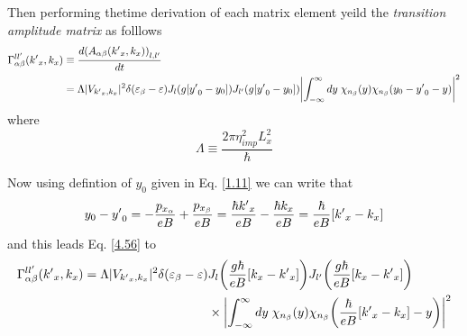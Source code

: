 Then performing thetime derivation of each matrix element yeild the \textit{transition amplitude matrix} as folllows
\begin{equation} \label{4.55}
  \begin{aligned}
    \Gamma_{\alpha\beta}^{ll'}({k'}_x,k_x) &  \equiv
    \frac{d \qty(A_{\alpha\beta}({k'}_x,k_x))_{l,l'}}{dt} \\
    & =
    \Lambda |V_{{k'}_x,k_x}|^2
    \delta(\varepsilon_{\beta} - \varepsilon)
    J_l\qty(g[{y'}_0 - y_0]) J_{l'}\qty(g[{y'}_0 - y_0])
    \qty|
    \int_{-\infty}^{\infty} dy \;
    {\chi}_{n_{\beta}}\qty(y)
    {\chi}_{n_{\beta}}\qty(y_0 - {y'}_0 - y)|^2
  \end{aligned}
\end{equation}
where
\begin{equation} \label{4.56}
    \Lambda \equiv
    \frac { 2\pi \eta_{imp}^2 L_x^2}{ \hbar}
\end{equation}

\noindent
Now using defintion of $y_0$ given in Eq. \eqref{1.11} we can write that
\begin{equation} \label{4.57}
    y_0 - {y'}_0 =
    - \frac{p_{x_{\alpha}}}{eB} + \frac{p_{x_{\beta}}}{eB} =
    \frac{\hbar {k'}_x}{eB} - \frac{\hbar {k}_x}{eB} =
    \frac{\hbar}{eB} \qty[{k'}_x - {k}_x]
\end{equation}
and this leads Eq. \eqref{4.56} to
\begin{equation} \label{4.58}
  \begin{aligned}
    \Gamma_{\alpha\beta}^{ll'}({k'}_x,k_x) =
    \Lambda |V_{{k'}_x,k_x}|^2
    \delta(\varepsilon_{\beta} - \varepsilon) &
    J_l\qty(\frac{g\hbar}{eB}[{k}_x - {k'}_x])
    J_{l'}\qty(\frac{g\hbar}{eB}[{k}_x - {k'}_x]) \\
    & \times
    \qty|
    \int_{-\infty}^{\infty} dy \;
    {\chi}_{n_{\beta}}\qty(y)
    {\chi}_{n_{\beta}}\qty(\frac{\hbar}{eB} \qty[{k'}_x - {k}_x] - y)|^2
  \end{aligned}
\end{equation}

